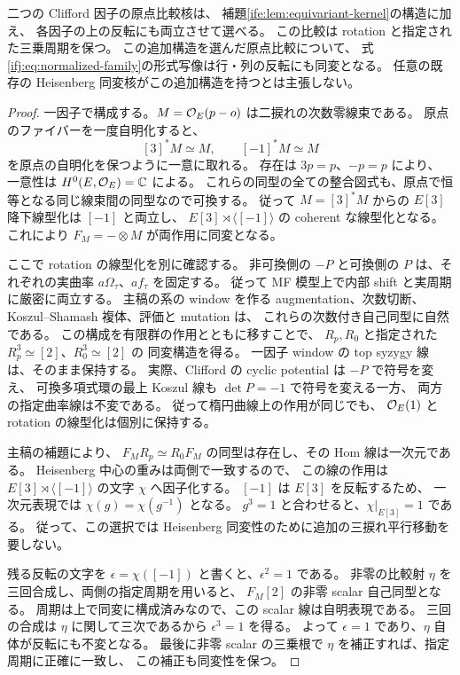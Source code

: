 \begin{lemma}
\label{ifj:lem:reflection-kernel}
二つの Clifford 因子の原点比較核は、
補題\ref{ife:lem:equivariant-kernel}の構造に加え、
各因子の上の反転にも両立させて選べる。
この比較は rotation と指定された三乗周期を保つ。
この追加構造を選んだ原点比較について、
式\eqref{ifj:eq:normalized-family}の形式写像は行・列の反転にも同変となる。
任意の既存の Heisenberg 同変核がこの追加構造を持つとは主張しない。
\end{lemma}

\begin{proof}
一因子で構成する。$M=\mathcal O_E(p-o)$ は二捩れの次数零線束である。
原点のファイバーを一度自明化すると、
\[
                  [3]^*M\simeq M,\qquad [-1]^*M\simeq M
\]
を原点の自明化を保つように一意に取れる。
存在は $3p=p$、$-p=p$ により、
一意性は $H^0(E,\mathcal O_E)=\mathbb C$ による。
これらの同型の全ての整合図式も、原点で恒等となる同じ線束間の同型なので可換する。
従って $M=[3]^*M$ からの $E[3]$ 降下線型化は $[-1]$ と両立し、
$E[3]\rtimes\langle[-1]\rangle$ の coherent な線型化となる。
これにより $F_M=-\otimes M$ が両作用に同変となる。

ここで rotation の線型化を別に確認する。
非可換側の $-P$ と可換側の $P$ は、それぞれの実曲率
$a\Omega_\tau$、$af_\tau$ を固定する。
従って MF 模型上で内部 shift と実周期に厳密に両立する。
主稿の系の window を作る
augmentation、次数切断、Koszul--Shamash 複体、評価と mutation は、
これらの次数付き自己同型に自然である。
この構成を有限群の作用とともに移すことで、
$R_p,R_0$ と指定された $R_p^3\simeq[2]$、$R_0^3\simeq[2]$ の
同変構造を得る。
一因子 window の top syzygy 線は、そのまま保持する。
実際、Clifford の cyclic potential は $-P$ で符号を変え、
可換多項式環の最上 Koszul 線も $\det P=-1$ で符号を変える一方、
両方の指定曲率線は不変である。
従って楕円曲線上の作用が同じでも、
$\mathcal O_E(1)$ と rotation の線型化は個別に保持する。

主稿の補題により、
$F_MR_p\simeq R_0F_M$ の同型は存在し、その Hom 線は一次元である。
Heisenberg 中心の重みは両側で一致するので、
この線の作用は $E[3]\rtimes\langle[-1]\rangle$ の文字 $\chi$ へ因子化する。
$[-1]$ は $E[3]$ を反転するため、
一次元表現では $\chi(g)=\chi(g^{-1})$ となる。
$g^3=1$ と合わせると、$\chi|_{E[3]}=1$ である。
従って、この選択では Heisenberg 同変性のために追加の三捩れ平行移動を要しない。

残る反転の文字を $\epsilon=\chi([-1])$ と書くと、$\epsilon^2=1$ である。
非零の比較射 $\eta$ を三回合成し、両側の指定周期を用いると、
$F_M[2]$ の非零 scalar 自己同型となる。
周期は上で同変に構成済みなので、この scalar 線は自明表現である。
三回の合成は $\eta$ に関して三次であるから $\epsilon^3=1$ を得る。
よって $\epsilon=1$ であり、$\eta$ 自体が反転にも不変となる。
最後に非零 scalar の三乗根で $\eta$ を補正すれば、指定周期に正確に一致し、
この補正も同変性を保つ。


\end{proof}
